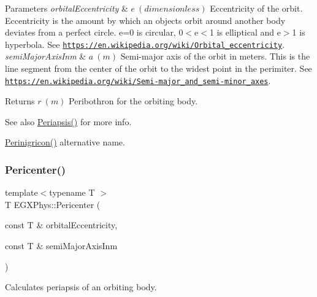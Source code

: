 \begin{DoxyParams}{Parameters}
{\em orbital\+Eccentricity} & $ e\ (dimensionless)$ Eccentricity of the orbit. Eccentricity is the amount by which an objects orbit around another body deviates from a perfect circle. e=0 is circular, 0$<$e$<$1 is elliptical and e$>$1 is hyperbola. See \href{https://en.wikipedia.org/wiki/Orbital_eccentricity}{\tt https\+://en.\+wikipedia.\+org/wiki/\+Orbital\+\_\+eccentricity}. \\
\hline
{\em semi\+Major\+Axis\+Inm} & $ a\ (m)$ Semi-\/major axis of the orbit in meters. This is the line segment from the center of the orbit to the widest point in the perimiter. See \href{https://en.wikipedia.org/wiki/Semi-major_and_semi-minor_axes}{\tt https\+://en.\+wikipedia.\+org/wiki/\+Semi-\/major\+\_\+and\+\_\+semi-\/minor\+\_\+axes}. \\
\hline
\end{DoxyParams}
\begin{DoxyReturn}{Returns}
$ r\ (m)$ Peribothron for the orbiting body. 
\end{DoxyReturn}
\begin{DoxySeeAlso}{See also}
\mbox{\hyperlink{group___e_g_x_phys-_periapsis_gad487212733711bc2ce73c8137c9309c3}{Periapsis()}} for more info. 

\mbox{\hyperlink{group___e_g_x_phys-_periapsis_ga2de34009308e46d1d3bd4eb8cd4b0a8d}{Perinigricon()}} alternative name. 
\end{DoxySeeAlso}
\mbox{\label{group___e_g_x_phys-_periapsis_gaa769950fdad108083236bb0efded1196}} 
\subsubsection{\texorpdfstring{Pericenter()}{Pericenter()}}
{\footnotesize\ttfamily template$<$typename T $>$ \\
T E\+G\+X\+Phys\+::\+Pericenter (\begin{DoxyParamCaption}\item[{const T \&}]{orbital\+Eccentricity,  }\item[{const T \&}]{semi\+Major\+Axis\+Inm }\end{DoxyParamCaption})}



Calculates periapsis of an orbiting body. 


